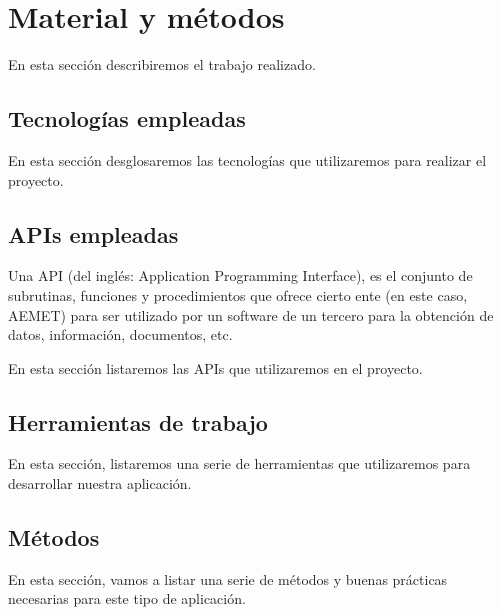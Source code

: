 \chapter{Material y métodos}
\label{material_y_metodos}

En esta sección describiremos el trabajo realizado.


\section{Tecnologías empleadas}
En esta sección desglosaremos las tecnologías que utilizaremos
 para realizar el proyecto.
















\section{APIs empleadas}
Una API (del inglés: Application Programming Interface), es el conjunto
 de subrutinas, funciones y procedimientos que ofrece cierto ente 
(en este caso, AEMET) para ser utilizado por un software de un tercero 
para la obtención de datos, información, documentos, etc.

En esta sección listaremos las APIs que utilizaremos en el proyecto.





\section{Herramientas de trabajo}
En esta sección, listaremos una serie de herramientas que utilizaremos
 para desarrollar nuestra aplicación.

\section{Métodos}
En esta sección, vamos a listar una serie de métodos y buenas prácticas 
necesarias para este tipo de aplicación.
